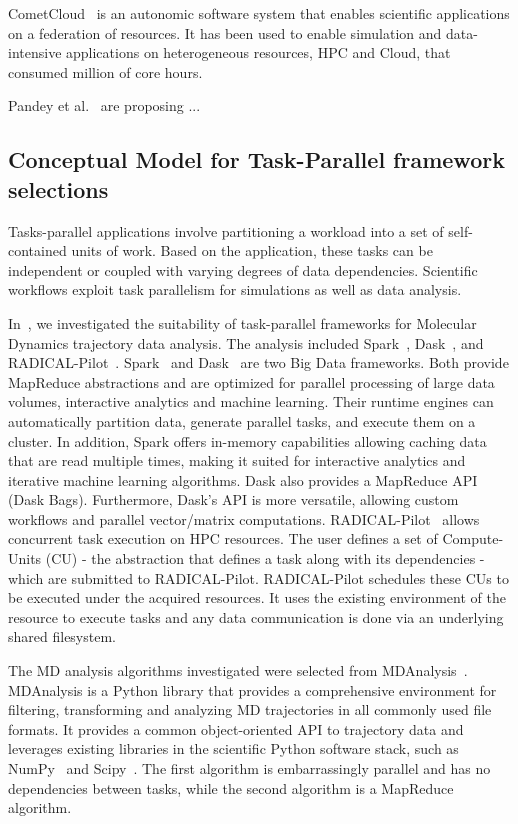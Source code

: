 CometCloud~\cite{diazmontes2015cometcloud} is an autonomic software system that enables scientific applications on a federation of resources. It has been used to enable simulation and data-intensive applications on heterogeneous resources, HPC and Cloud, that consumed million of core hours.

Pandey et al.~\cite{pandey2012autonomic} are proposing ...

\subsection{Conceptual Model for Task-Parallel framework selections}
Tasks-parallel applications involve partitioning a workload into a set of self-contained units of work. Based on the application, these tasks can be independent or coupled with varying degrees of data dependencies. Scientific workflows exploit task parallelism for simulations as well as data analysis.

In~\cite{paraskevakos2018task}, we investigated the suitability of task-parallel frameworks for Molecular Dynamics trajectory data analysis. The analysis included Spark~\cite{zaharia2010spark}, Dask~\cite{rocklin2015dask}, and RADICAL-Pilot~\cite{merzky2019using}. Spark~\cite{zaharia2010spark} and Dask~\cite{rocklin2015dask} are two Big Data frameworks. Both provide MapReduce abstractions and are optimized for parallel processing of large data volumes, interactive analytics and machine learning. Their runtime engines can automatically partition data, generate parallel tasks, and execute them on a cluster. In addition, Spark offers in-memory capabilities allowing caching data that are read multiple times, making it suited for interactive analytics and iterative machine learning algorithms. Dask also provides a MapReduce API (Dask Bags). Furthermore, Dask’s API is more versatile, allowing custom workflows and parallel vector/matrix computations. RADICAL-Pilot~\cite{merzky2019using} allows concurrent task execution on HPC resources. The user defines a set of Compute-Units (CU) - the abstraction that defines a task along with its dependencies - which are submitted to RADICAL-Pilot. RADICAL-Pilot schedules these CUs to be executed under the acquired resources. It uses the existing environment of the resource to execute tasks and any data communication is done via an underlying shared filesystem.

The MD analysis algorithms investigated were selected from MDAnalysis~\cite{gowers2016mdanalysis,michaud2011mdanalysis}. MDAnalysis is a Python library that provides a comprehensive environment for filtering, transforming and analyzing MD trajectories in all commonly used file formats. It provides a common object-oriented API to trajectory data and leverages existing libraries in the scientific Python software stack, such as NumPy~\cite{numpy} and Scipy~\cite{scipy}. The first algorithm is embarrassingly parallel and has no dependencies between tasks, while the second algorithm is a MapReduce algorithm.

